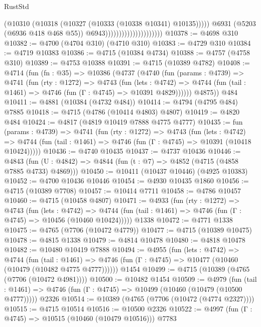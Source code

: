 \begin{lexlean}{RustStd}
\begin{coremodule}
                                                (@10310
                                                  (@10318
                                                    (@10327 (@10333 (@10338 @10341) @10135)))))
                                              @6931
                                              (@5203 (@6936 @418 @468 @55))
                                              @6943)))))))))))))))))))))
@10378 := @4698 @310
@10382 := @4700 (@4704 @310) (@4710 @310)
@10383 := @4729 @310
@10384 := @4719 @10383
@10386 := @4715 (@10384 @4734)
@10388 := @4757 (@4758 @310)
@10389 := @4753 @10388
@10391 := @4715 (@10389 @4782)
@10408 := @4714
    (fun (fn : @35) =>
    @10386
      (@4737
        (@4740
          (fun (params : @4739) =>
          @4741
            (fun (rty : @1272) =>
            @4743
              (fun (lets : @4742) =>
              @4744 (fun (tail : @1461) => @4746 (fun (Γ : @4745) => @10391 @4829))))))
        @4875))
    @484
@10411 := @4881 (@10384 (@4732 @484))
@10414 := @4794 (@4795 @484) @7885
@10418 := @4715 (@4786 (@10414 @4803) @4807)
@10419 := @4820 @484
@10424 := @4817 (@4819 @10419 @7888 @4775 @4777)
@10435 := fun (params : @4739) =>
  @4741
    (fun (rty : @1272) =>
    @4743
      (fun (lets : @4742) =>
      @4744 (fun (tail : @1461) => @4746 (fun (Γ : @4745) => @10391 (@10418 @10424)))))
@10436 := @4740 @10435
@10437 := @4737 @10436
@10446 := @4843 (fun (U : @4842) => @4844 (fun (t : @7) => @4852 (@4715 (@4858 @7885 @4733) @4869)))
@10450 := @10411 (@10437 @10446) (@4925 @10383)
@10452 := @4700 @10436 @10446
@10454 := @4930 @10435 @1860
@10456 := @4715 (@10389 @7708)
@10457 := @10414 @7711
@10458 := @4786 @10457
@10460 := @4715 (@10458 @4807)
@10471 := @4933
    (fun (rty : @1272) =>
    @4743
      (fun (lets : @4742) =>
      @4744 (fun (tail : @1461) => @4746 (fun (Γ : @4745) => @10456 (@10460 @10424)))))
    @1338
@10472 := @4771 @1338
@10475 := @4765 (@7706 (@10472 @4779))
@10477 := @4715 (@10389 @10475)
@10478 := @4815 @1338
@10479 := @4814 @10478
@10480 := @4818 @10478
@10482 := @10480 @10419 @7888
@10494 := @4955
    (fun (lets : @4742) =>
    @4744
      (fun (tail : @1461) =>
      @4746 (fun (Γ : @4745) => @10477 (@10460 (@10479 (@10482 @4775 @4777))))))
    @1454
@10499 := @4715 (@10389 (@4765 (@7706 (@10472 @4981))))
@10500 := @10482 @1454
@10509 := @4979
    (fun (tail : @1461) => @4746 (fun (Γ : @4745) => @10499 (@10460 (@10479 (@10500 @4777)))))
    @2326
@10514 := @10389 (@4765 (@7706 (@10472 (@4774 @2327))))
@10515 := @4715 @10514
@10516 := @10500 @2326
@10522 := @4997 (fun (Γ : @4745) => @10515 (@10460 (@10479 @10516))) @7783

\end{coremodule}
\end{lexlean}
